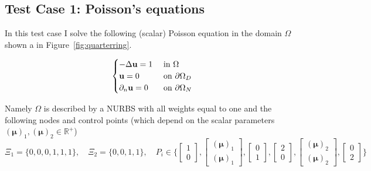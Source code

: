 \documentclass[11pt]{article}
\begin{document}
\subsection{Test Case 1: Poisson's equations}
In this test case I solve the following (scalar) Poisson equation in the domain $\Omega$ shown a in Figure~\ref{fig:quarterring}.

\begin{equation}
    \begin{cases}
    -\Delta \mathbf u = 1 & \textnormal{ in } \Omega\\
    \mathbf u = 0 & \textnormal{ on } \partial\Omega_D\\
    \partial_n \mathbf u = 0 & \textnormal{ on } \partial\Omega_N\\
    \end{cases}
\label{eq:problem1}
\end{equation}

Namely $\Omega$ is described by a NURBS with all weights equal to one and the following nodes and control points (which depend on the scalar parameters $(\boldsymbol \mu)_1, (\boldsymbol \mu)_2 \in \mathbb R^+$)
\begin{equation*}
    \Xi_1 = \{0, 0, 0, 1, 1, 1\}, \quad
    \Xi_2 = \{0, 0, 1, 1\}, \quad
    P_i \in \bigg\{
\begin{bmatrix}
     1\\0
\end{bmatrix},
\begin{bmatrix}
     (\boldsymbol \mu)_1\\(\boldsymbol \mu)_1
\end{bmatrix}, 
\begin{bmatrix}
     0\\1
\end{bmatrix}, 
\begin{bmatrix}
     2\\0
\end{bmatrix}, 
\begin{bmatrix}
     (\boldsymbol \mu)_2\\ (\boldsymbol \mu)_2
\end{bmatrix} ,
\begin{bmatrix}
     0\\2
\end{bmatrix} 
    \bigg\}    
\end{equation*}
\end{document}
